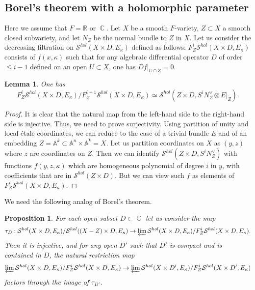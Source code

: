 \documentclass[12pt,reqno]{amsart}
\DeclareMathOperator\C{\mathbb C}
\newtheorem{lemma}[theorem]{Lemma}
\newtheorem{prop}[theorem]{Proposition}
\theoremstyle{definition}
\theoremstyle{remark}
\numberwithin{equation}{section}
\newcommand{\A}{{\mathbb A}}
\newcommand{\ot}{\otimes}
\renewcommand{\SS}{{\mathcal S}}
\newcommand{\sub}{\subset}
\newcommand{\ov}{\overline}
\newcommand{\GL}{\operatorname{GL}}
\newcommand{\XX}{{\mathcal X}}
\newcommand{\R}{{\mathbb R}}
\begin{document}



\subsection{Borel's theorem with a holomorphic parameter}

Here we assume that $F=\R$ or $\C$. 
Let $X$ be a smooth $F$-variety, $Z\sub X$ a smooth closed subvariety, and let $N_Z$ be the normal bundle to $Z$ in $X$.
Let us consider the decreasing filtration on $\SS^{hol}(X\times D,E_{\kappa})$ defined as follows:
$F_Z^i\SS^{hol}(X\times D,E_{\kappa})$
consists of $f(x,\kappa)$ such that for any algebraic differential operator $D$ of order $\le i-1$ defined
on an open $U\sub X$, one has $Df|_{U\cap Z}=0$.

\begin{lemma}\label{filtr-lem}
One has
$$F_Z^i\SS^{hol}(X\times D,E_{\kappa})/F_Z^{i+1}\SS^{hol}(X\times D,E_{\kappa})\simeq \SS^{hol}(Z\times D,S^iN_Z^\vee\ot E|_Z).$$
\end{lemma}

\begin{proof} It is clear that the natural map from the left-hand side to the right-hand side is injective. Thus, we need to prove surjectivity.
Using partition of unity and local \'etale coordinates, we can reduce to the case of a trivial bundle $E$ and of an embedding $Z=\A^k\sub \A^n\times \A^k=X$.
Let us partition coordinates on $X$ as $(y,z)$ where $z$ are coordinates on $Z$. Then we can identify $\SS^{hol}(Z\times D,S^iN_Z^\vee)$ with
functions $f(y,z,\kappa)$ which are homogeneous polynomial of degree $i$ in $y$, with coefficients that are in $\SS^{hol}(Z\times D)$. But we can view such $f$ as elements
of $F_Z^i\SS^{hol}(X\times D,E_{\kappa})$.
\end{proof}

We need the following analog of Borel's theorem.

\begin{prop}\label{Borel-thm-prop}
For each open subset $D\sub \C$ let us consider the map
$$\tau_D:\SS^{hol}(X\times D,E_{\kappa})/\SS^{hol}((X-Z)\times D,E_{\kappa})\to \varprojlim \SS^{hol}(X\times D,E_{\kappa})/F_Z^i\SS^{hol}(X\times D,E_{\kappa}).$$
Then it is injective,
and for any open $D'$ such that $\ov{D'}$ is compact and is contained in $D$, the natural restriction map
\begin{equation}\label{completion-res-map}
\varprojlim \SS^{hol}(X\times D,E_{\kappa})/F_Z^i\SS^{hol}(X\times D,E_{\kappa})\to \varprojlim \SS^{hol}(X\times D',E_{\kappa})/F_Z^i\SS^{hol}(X\times D',E_{\kappa})
\end{equation}
factors through the image of $\tau_{D'}$.
\end{prop}
\end{document}
